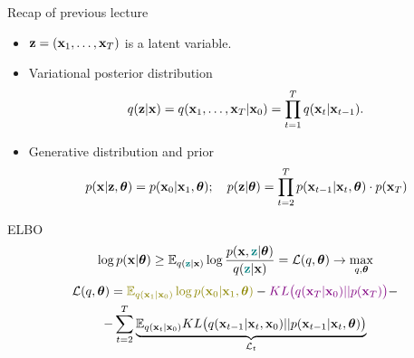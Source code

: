 

\usepackage{tikz}

\usetikzlibrary{arrows,shapes,positioning,shadows,trees}

\begin{frame}
\titlepage
\end{frame}
\begin{frame}{Recap of previous lecture}
	\begin{itemize}
		\item $\mathbf{z} = (\mathbf{x}_1, \dots, \mathbf{x}_T)$ is a latent variable.
		\item Variational posterior distribution
		\vspace{-0.2cm}
		\[
			q(\mathbf{z} | \mathbf{x}) = q(\mathbf{x}_1, \dots, \mathbf{x}_T | \mathbf{x}_0) = \prod_{t = 1}^T q(\mathbf{x}_t | \mathbf{x}_{t - 1}).
		\]
		\vspace{-0.3cm}
		\item Generative distribution and prior
		\vspace{-0.2cm}
		\[
			p(\mathbf{x} | \mathbf{z}, \boldsymbol{\theta}) = p(\mathbf{x}_0 | \mathbf{x}_1, \boldsymbol{\theta}); \quad 
			p(\mathbf{z} | \boldsymbol{\theta}) = \prod_{t=2}^T p(\mathbf{x}_{t - 1} | \mathbf{x}_t, \boldsymbol{\theta}) \cdot p(\mathbf{x}_T)
		\]
	\end{itemize}
	\vspace{-0.2cm}
	\begin{block}{ELBO}
		\vspace{-0.2cm}
		\[
			\log p(\mathbf{x} | \boldsymbol{\theta}) \geq \mathbb{E}_{q({\color{teal}\mathbf{z}} | \mathbf{x})} \log \frac{p(\mathbf{x}, {\color{teal}\mathbf{z}} | \boldsymbol{\theta})}{q({\color{teal}\mathbf{z}} | \mathbf{x})} = \mathcal{L}(q, \boldsymbol{\theta}) \rightarrow \max_{q, \boldsymbol{\theta}}
		\]
		\vspace{-0.5cm}
		\begin{multline*}
			\cL(q, \btheta) =  {\color{olive}\bbE_{q(\bx_1 | \bx_0)} \log p(\bx_0 | \bx_1, \btheta)} - {\color{violet}KL\bigl(q(\bx_T | \bx_0) || p(\bx_T)\bigr)} - \\
			- \sum_{t=2}^T  \underbrace{ \bbE_{q(\bx_t | \bx_0)}KL \bigl(q(\bx_{t-1} | \bx_t, \bx_0) || p(\bx_{t - 1} | \bx_t, \btheta )\bigr)}_{\cL_t}
		\end{multline*}
	\end{block}
\end{frame}
